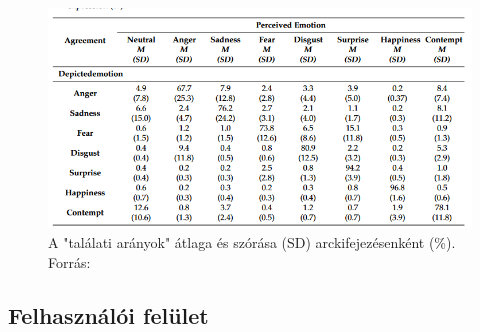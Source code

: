 \documentclass[12pt,a4]{article}
\begin{document}
    \begin{figure}[h!]	
		\centering
		\includegraphics[width=1\linewidth]{facerechuman-confmatrix.png}
        \caption{A "találati arányok" átlaga és szórása (SD) arckifejezésenként (\%). Forrás: \cite{facerecresult}}
        \label{fig:humanfacerecmatrix}
	\end{figure}
    
    \subsection{Felhasználói felület}
	
\end{document}
